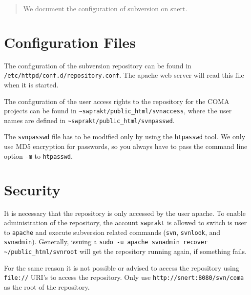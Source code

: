 \documentclass[a4paper,11pt]{article}
\begin{document}
\begin{abstract}
  We document the configuration of subversion on snert.
\end{abstract}


\section{Configuration Files}
\label{sec:config}

The configuration of the subversion repository can be found in
\texttt{/etc/httpd/conf.d/repository.conf}.  The apache web server
will read this file when it is started.

The configuration of the user access rights to the repository for the
COMA projects can be found in
\texttt{\~{}swprakt/public\_html/svnaccess}, where the user
names are defined in
\texttt{\~{}swprakt/public\_html/svnpasswd}.

The \texttt{svnpasswd} file has to be modified only by using the
\texttt{htpasswd} tool.  We only use MD5 encryption for passwords, so
you always have to pass the command line option \texttt{-m} to
\texttt{htpasswd}.



\section{Security}
\label{sec:security}

It is necessary that the repository is only accessed by the user
apache.  To enable administration of the repository, the account
\texttt{swprakt} is allowed to switch is user to \texttt{apache} and
execute subversion related commands (\texttt{svn}, \texttt{svnlook},
and \texttt{svnadmin}).  Generally, issuing a \texttt{sudo -u apache
  svnadmin recover \~{}/public\_html/svnroot} will get the repository
running again, if something fails.

For the same reason it is not possible or advised to access the
repository using \texttt{file://} URI's to access the repository.
Only use \texttt{http://snert:8080/svn/coma} as the root of the
repository.
\end{document}
